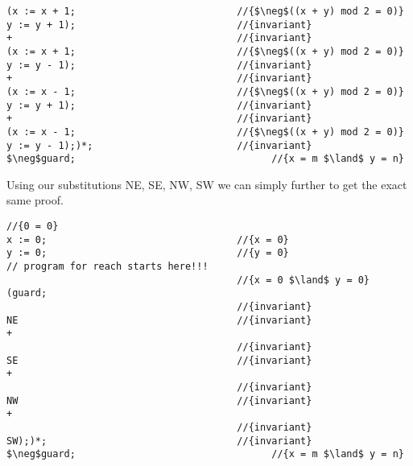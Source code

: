 \documentclass{article}
\begin{document}
\begin{enumerate}[(a)]
\begin{lstlisting}[language=Maple,mathescape=true]
(x := x + 1;                            //{$\neg$((x + y) mod 2 = 0)}
y := y + 1);                            //{invariant}
+                                       //{invariant} 
(x := x + 1;                            //{$\neg$((x + y) mod 2 = 0)}
y := y - 1);                            //{invariant}
+                                       //{invariant}
(x := x - 1;                            //{$\neg$((x + y) mod 2 = 0)}
y := y + 1);                            //{invariant}          
+                                       //{invariant}
(x := x - 1;                            //{$\neg$((x + y) mod 2 = 0)}
y := y - 1);)*;                         //{invariant}
$\neg$guard;                                  //{x = m $\land$ y = n}

    \end{lstlisting} 
Using our substitutions NE, SE, NW, SW we can simply further to get the exact same proof.
    \begin{lstlisting}[language=Maple,mathescape=true]
                                        //{0 = 0}
x := 0;                                 //{x = 0}
y := 0;                                 //{y = 0}
// program for reach starts here!!!
                                        //{x = 0 $\land$ y = 0}
(guard;
                                        //{invariant}
NE                                      //{invariant}
+                                        
                                        //{invariant}
SE                                      //{invariant}
+                                       
                                        //{invariant}
NW                                      //{invariant}
+       
                                        //{invariant}
SW);)*;                                 //{invariant}
$\neg$guard;                                  //{x = m $\land$ y = n}

    \end{lstlisting}
\end{enumerate}

\newpage
\end{document}
